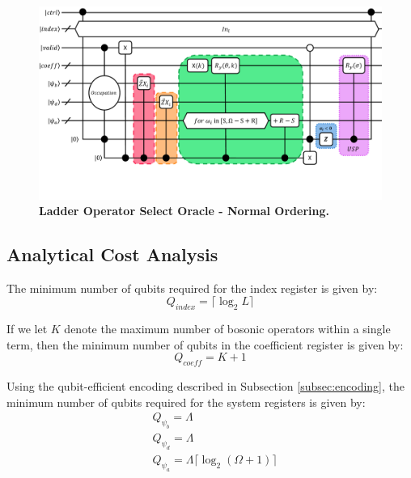 \begin{figure}
    \centering
    \includegraphics[width=16cm]{figures/select-normal-ordering.pdf}
    \caption{\textbf{Ladder Operator Select Oracle - Normal Ordering.}
    }
    \label{fig:select-normal-ordering}
\end{figure}

\subsection{Analytical Cost Analysis}
\label{subsec:analytics}

The minimum number of qubits required for the index register is given by:
\begin{equation}
    Q_{\textit{index}} = \lceil \log_2{L} \rceil
\end{equation}

If we let $K$ denote the maximum number of bosonic operators within a single term, then the minimum number of qubits in the coefficient register is given by:
\begin{equation}
    Q_{\textit{coeff}} = K + 1
\end{equation} 

Using the qubit-efficient encoding described in Subsection \ref{subsec:encoding}, the minimum number of qubits required for the system registers is given by:
\begin{equation}
    \begin{split}
        &Q_{\psi_b} = \Lambda \\
        &Q_{\psi_d} = \Lambda \\
        &Q_{\psi_a} = \Lambda \lceil \log_2{(\Omega + 1)} \rceil
    \end{split}
\end{equation} 

